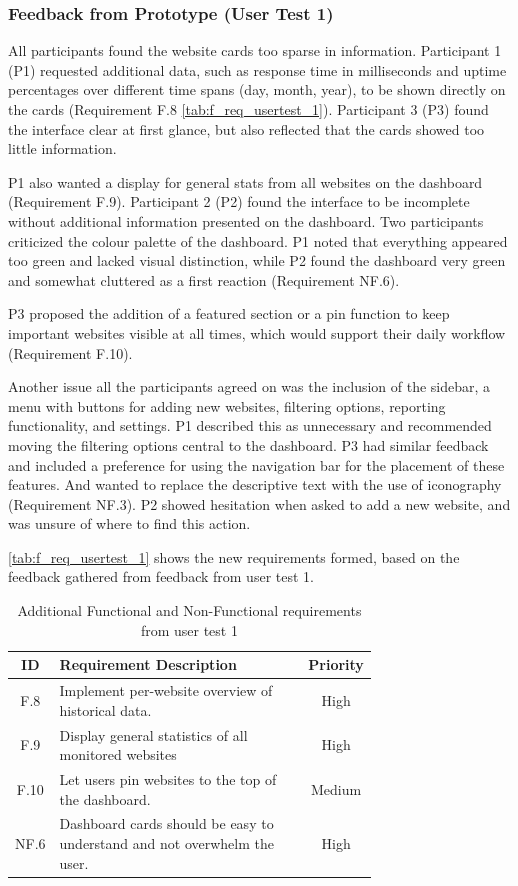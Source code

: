 \subsubsection{Feedback from Prototype (User Test 1)}  
All participants found the website cards too sparse in information. Participant 1 (P1) requested additional data, such as response time in milliseconds and uptime percentages over different time spans (day, month, year), to be shown directly on the cards (Requirement F.8 \autoref{tab:f_req_usertest_1}). Participant 3 (P3) found the interface clear at first glance, but also reflected that the cards showed too little information. 

P1 also wanted a display for general stats from all websites on the dashboard (Requirement F.9).  Participant 2 (P2) found the interface to be incomplete without additional information presented on the dashboard. Two participants criticized the colour palette of the dashboard. P1 noted that everything appeared too green and lacked visual distinction, while P2 found the dashboard very green and somewhat cluttered as a first reaction (Requirement NF.6).

P3 proposed the addition of a featured section or a pin function to keep important websites visible at all times, which would support their daily workflow (Requirement F.10). 

Another issue all the participants agreed on was the inclusion of the sidebar, a menu with buttons for adding new websites, filtering options, reporting functionality, and settings. P1 described this as unnecessary and recommended moving the filtering options central to the dashboard. P3 had similar feedback and included a preference for using the navigation bar for the placement of these features. And wanted to replace the descriptive text with the use of iconography (Requirement NF.3). P2 showed hesitation when asked to add a new website, and was unsure of where to find this action.

\autoref{tab:f_req_usertest_1} shows the new requirements formed, based on the feedback gathered from feedback from user test 1.

\begin{table}[H]
    \centering
    \begin{tabular}{|c|p{0.72\linewidth}|c|} \hline
    \textbf{ID} & \textbf{Requirement Description} & \textbf{Priority} \\ \hline
         F.8 &  Implement per-website overview of historical data.& High\\ \hline 
         F.9 &  Display general statistics of all monitored websites & High\\ \hline 
         F.10 & Let users pin websites to the top of the dashboard.&Medium\\\hline
         NF.6 &  Dashboard cards should be easy to understand and not overwhelm the user.& High\\ \hline
    \end{tabular}
    \caption{Additional Functional and Non-Functional requirements from user test 1}
    \label{tab:f_req_usertest_1}
\end{table}



